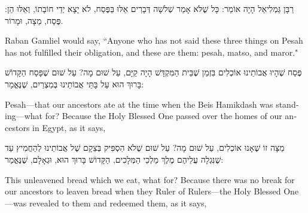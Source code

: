  \break
 
 
 רַבָּן גַּמְלִיאֵל הָיָה אוֹמֵר: כָּל שֶׁלֹּא אָמַר שְׁלשָׁה דְּבָרִים אֵלּוּ בַּפֶּסַח, לֹא יָצָא יְדֵי חוֹבָתוֹ, וְאֵלּוּ הֵן: פֶּסַח, מַצָה, וּמָרוֹר.
 
 \begin{english}
Raban Gamliel would say, ``Anyone who has not said these three things on Pesah has not fulfilled their obligation, and these are them: pesah, matso, and maror."
 \end{english}
 

פֶּסַח שֶׁהָיוּ אֲבוֹתֵינוּ אוֹכְלִים בִּזְמַן שֶׁבֵּית הַמִּקְדָּשׁ הָיָה קַיָּם, עַל שׁוּם מָה? עַל שׁוּם שֶׁפָּסַח הַקָּדוֹשׁ בָּרוּךְ הוּא עַל בָּתֵּי אֲבוֹתֵינוּ בְּמִצְרַיִם, שֶׁנֶּאֱמַר:

\begin{english}
Pesah—that our ancestors ate at the time when the Beis Hamikdash was standing—what for? Because the Holy Blessed One passed over the homes of our ancestors in Egypt, as it says, 
\end{english}


מַצָּה זוֹ שֶׁאָנוּ אוֹכְלִים, עַל שׁוּם מָה? עַל שׁוּם שֶׁלֹא הִסְפִּיק בְּצֵקָם שֶׁל אֲבוֹתֵינוּ לְהַחֲמִיץ עַד שֶׁנִּגְלָה עֲלֵיהֶם מֶלֶךְ מַלְכֵי הַמְּלָכִים, הַקָּדוֹשׁ בָּרוּךְ הוּא, וּגְאָלָם, שֶׁנֶּאֱמַר:

\begin{english}
This unleavened bread which we eat, what for? Because there was no break for our ancestors to leaven bread when they Ruler of Rulers—the Holy Blessed One—was revealed to them and redeemed them, as it says, 
\end{english}

